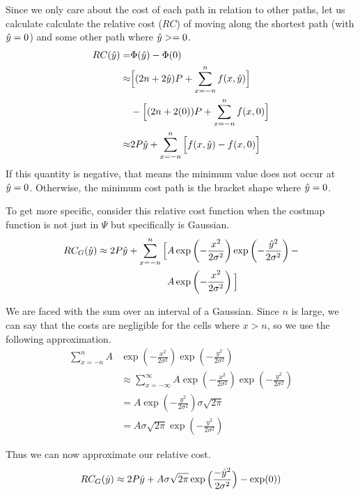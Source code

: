 Since we only care about the cost of each path in relation to other paths, let us calculate calculate the relative cost ($RC$) of moving along the shortest path (with $\hat{y}=0$) and some other path where $\hat{y}>=0$. 
\begin{align*}
RC(\hat{y}) =& \Phi(\hat{y})-\Phi(0) \\
\approx& \Big[(2n+2\hat{y})P +  \sum\limits_{x=-n}^{n} f(x,\hat{y}) \Big] \\
 & - \Big[(2n+2(0))P +  \sum\limits_{x=-n}^{n} f(x,0) \Big] \\
\approx& 2P\hat{y} + \sum\limits_{x=-n}^{n} \Big[ f(x,\hat{y})-f(x,0) \Big]
\end{align*}
If this quantity is negative, that means the minimum value does not occur at $\hat{y}=0$. Otherwise, the minimum cost path is the bracket shape where $\hat{y}=0$.

To get more specific, consider this relative cost function when the costmap function is not just in $\Psi$ but specifically is Gaussian. 
\begin{align*}
RC_G(\hat{y}) \approx 2P\hat{y} + \sum\limits_{x=-n}^{n} \Big[ &A\exp\left(-\frac{x^2}{2\sigma^2}\right)\exp\left(-\frac{\hat{y}^2}{2\sigma^2}\right) -\\
                                                           &A\exp\left(-\frac{x^2}{2\sigma^2}\right) \Big] 
\end{align*}

We are faced with the sum over an interval of a Gaussian. Since $n$ is large, we can say that the costs are negligible for the cells where $x>n$, so we use the following approximation. 
\begin{align*}
        \sum\limits_{x=-n}^{n} A&\exp\left(-\frac{x^2}{2\sigma^2}\right)\exp\left(-\frac{y^2}{2\sigma^2}\right) \\
&\approx \sum\limits_{x=-\infty}^{\infty} A\exp\left(-\frac{x^2}{2\sigma^2}\right)\exp\left(-\frac{y^2}{2\sigma^2}\right)  \\
&= A\exp\left(-\frac{y^2}{2\sigma^2}\right)\sigma\sqrt{2\pi} \\
&= A\sigma\sqrt{2\pi}\exp\left(-\frac{y^2}{2\sigma^2}\right)
\end{align*}

Thus we can now approximate our relative cost. 
\[
RC_G(\hat{y}) \approx 2P\hat{y} + A\sigma\sqrt{2\pi} \exp\Big(\frac{-\hat{y}^2}{2\sigma^2}\Big) - \exp(0) ) \\
\]

